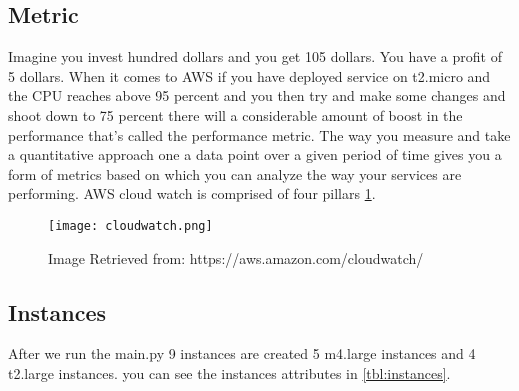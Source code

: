 \documentclass[12pt]{article}
\begin{document}
        \subsection{Metric}
        Imagine you invest hundred dollars and you get 105 dollars. You have a profit of 5 dollars.
        When it comes to AWS if you have deployed service on t2.micro and the CPU reaches above 95 percent and you then try and make some changes and shoot down to 75 percent there will a considerable amount of boost in the performance that's called the performance metric. The way you measure and take a quantitative approach one a data point over a given period of time gives you a form of metrics based on which you can analyze the way your services are performing. AWS cloud watch is comprised of four pillars \ref{fig:cw}.

        \begin{figure}[htpb]
        \captionsetup{font=footnotesize,labelfont=footnotesize}
        \centering
        \texttt{[image: cloudwatch.png]}
            \caption{Image Retrieved from: https://aws.amazon.com/cloudwatch/}
            \label{fig:cw}
        \end{figure}

        \subsection{Instances}
        After we run the main.py 9 instances are created 5 m4.large instances and 4 t2.large instances. you can see the instances attributes in \ref{tbl:instances}. 

        \begin{table}[]
            \centering
        \caption{Instances Specifications}
            \label{tbl:instances}
        \end{table}
\end{document}
